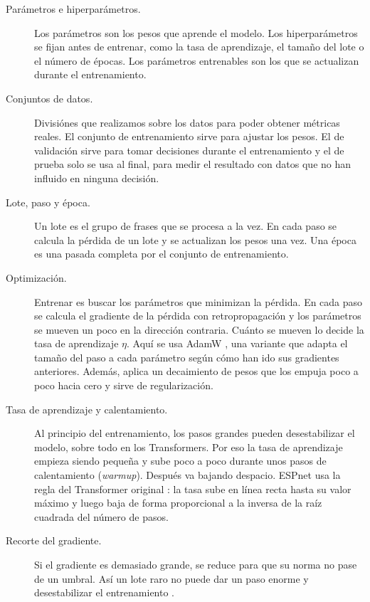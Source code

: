 \begin{description}
  \item[Parámetros e hiperparámetros.] Los parámetros son los pesos que aprende el modelo. Los hiperparámetros se fijan antes de entrenar, como la tasa de aprendizaje, el tamaño del lote o el número de épocas. Los parámetros entrenables son los que se actualizan durante el entrenamiento.

  \item[Conjuntos de datos.] Divisiónes que realizamos sobre los datos para poder obtener métricas reales. El conjunto de entrenamiento sirve para ajustar los pesos. El de validación sirve para tomar decisiones durante el entrenamiento y el de prueba solo se usa al final, para medir el resultado con datos que no han influido en ninguna decisión.

  \item[Lote, paso y época.] Un lote es el grupo de frases que se procesa a la vez. En cada paso se calcula la pérdida de un lote y se actualizan los pesos una vez. Una época es una pasada completa por el conjunto de entrenamiento.

  \item[Optimización.] Entrenar es buscar los parámetros que minimizan la pérdida. En cada paso se calcula el gradiente de la pérdida con retropropagación y los parámetros se mueven un poco en la dirección contraria. Cuánto se mueven lo decide la tasa de aprendizaje $\eta$. Aquí se usa AdamW \cite{kingma2015adam,loshchilov2019adamw}, una variante que adapta el tamaño del paso a cada parámetro según cómo han ido sus gradientes anteriores. Además, aplica un decaimiento de pesos que los empuja poco a poco hacia cero y sirve de regularización.

  \item[Tasa de aprendizaje y calentamiento.] Al principio del entrenamiento, los pasos grandes pueden desestabilizar el modelo, sobre todo en los Transformers. Por eso la tasa de aprendizaje empieza siendo pequeña y sube poco a poco durante unos pasos de calentamiento (\textit{warmup}). Después va bajando despacio. ESPnet usa la regla del Transformer original \cite{vaswani2017attention}: la tasa sube en línea recta hasta su valor máximo y luego baja de forma proporcional a la inversa de la raíz cuadrada del número de pasos.

  \item[Recorte del gradiente.] Si el gradiente es demasiado grande, se reduce para que su norma no pase de un umbral. Así un lote raro no puede dar un paso enorme y desestabilizar el entrenamiento \cite{pascanu2013clipping}.


\end{description}
